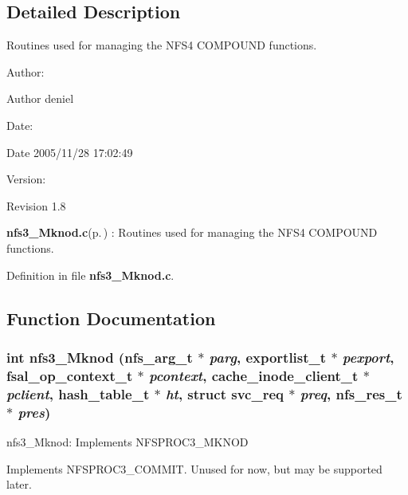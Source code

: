 \subsection{Detailed Description}
Routines used for managing the NFS4 COMPOUND functions. 

\begin{Desc}
\item[Author:]\begin{Desc}
\item[Author]deniel \end{Desc}
\end{Desc}
\begin{Desc}
\item[Date:]\begin{Desc}
\item[Date]2005/11/28 17:02:49 \end{Desc}
\end{Desc}
\begin{Desc}
\item[Version:]\begin{Desc}
\item[Revision]1.8 \end{Desc}
\end{Desc}
{\bf nfs3\_\-Mknod.c}{\rm (p.\,\pageref{nfs3__Mknod_8c})} : Routines used for managing the NFS4 COMPOUND functions.

Definition in file {\bf nfs3\_\-Mknod.c}.

\subsection{Function Documentation}
\subsubsection{\setlength{\rightskip}{0pt plus 5cm}int nfs3\_\-Mknod (nfs\_\-arg\_\-t $\ast$ {\em parg}, exportlist\_\-t $\ast$ {\em pexport}, fsal\_\-op\_\-context\_\-t $\ast$ {\em pcontext}, cache\_\-inode\_\-client\_\-t $\ast$ {\em pclient}, hash\_\-table\_\-t $\ast$ {\em ht}, struct svc\_\-req $\ast$ {\em preq}, nfs\_\-res\_\-t $\ast$ {\em pres})}\label{nfs3__Mknod_8c_a0}


nfs3\_\-Mknod: Implements NFSPROC3\_\-MKNOD

Implements NFSPROC3\_\-COMMIT. Unused for now, but may be supported later.

